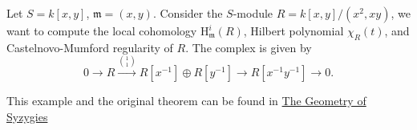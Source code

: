 \documentclass[../main.tex]{subfiles}
\begin{document}
\begin{example}
Let $S=k[x,y]$, $\mathfrak{m}=(x,y)$. Consider the $S$-module $R=k[x,y]/(x^{2}, xy)$, we want to compute the local cohomology $\mathrm{H}_{\mathfrak{m}}^{i}(R)$, Hilbert polynomial $\chi_{R}(t)$, and Castelnovo-Mumford regularity of $R$. The \Cech complex is given by 
$$0\rightarrow R\xrightarrow{\binom{1}{1}} R[x^{-1}]\oplus R[y^{-1}]\rightarrow R[x^{-1}y^{-1}]\rightarrow 0.$$
\end{example}
\begin{remark}[Reference]
This example and the original theorem can be found in \href{http://www.msri.org/people/staff/de/ready.pdf}{The Geometry of Syzygies
}
\end{remark}
\end{document}

